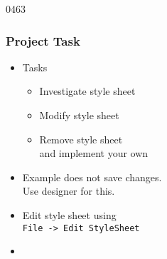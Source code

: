 \begin{slide}{0463}\frametitle{Project Task}
\begin{itemize}
\item Tasks
  \begin{itemize}
  \item Investigate style sheet
  \item Modify style sheet
  \item Remove style sheet \\ and implement your own
 \end{itemize}
\item Example does not save changes. \\ Use designer for this.
\item Edit style sheet using \\ \texttt{File -> Edit StyleSheet}
\item[] 
\end{itemize}
\end{slide}
